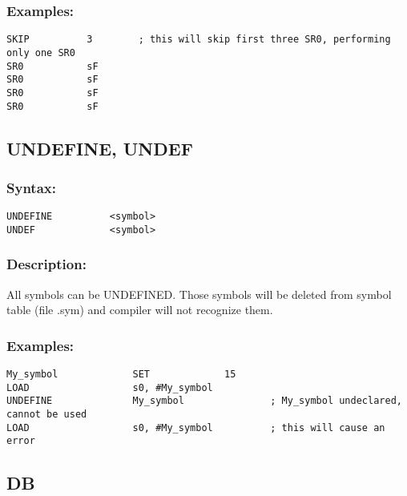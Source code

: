         \subsubsection{Examples:}
            {
                \usecodefont
                \verb'SKIP          3        ; this will skip first three SR0, performing only one SR0'\\
                \verb'SR0           sF'\\
                \verb'SR0           sF'\\
                \verb'SR0           sF'\\
                \verb'SR0           sF'\\
            }

    \subsection{UNDEFINE, UNDEF}

        \subsubsection{Syntax:}
            {
                \usecodefont
                \verb'UNDEFINE          <symbol>'\\
                \verb'UNDEF             <symbol>'
            }

        \subsubsection{Description:}
            All symbols can be UNDEFINED. Those symbols will be deleted from symbol table (file .sym) and compiler will not recognize them.

        \subsubsection{Examples:}
            {
                \usecodefont
                \verb'My_symbol             SET             15'\\
                \verb'LOAD                  s0, #My_symbol'\\
                \verb'UNDEFINE              My_symbol               ; My_symbol undeclared, cannot be used'\\
                \verb'LOAD                  s0, #My_symbol          ; this will cause an error'\\
            }

    \subsection{DB}
